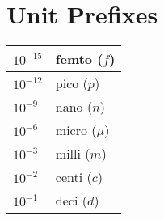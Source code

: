 \documentclass[12pt]{article}
\begin{document}
\section{Unit Prefixes}
\begin{center}
    \begin{tabular}{|l|l|}
        \hline
        $10^{-15}$ & femto	($f$)    \\ \hline
        $10^{-12}$ & pico	($p$)    \\ \hline
        $10^{-9}$  & nano	($n$)    \\ \hline
        $10^{-6}$  & micro	($\mu$)  \\ \hline
        $10^{-3}$  & milli	($m$)    \\ \hline
        $10^{-2}$  & centi	($c$)    \\ \hline
        $10^{-1}$  & deci	($d$)    \\ \hline
    \end{tabular}
\end{center}
\end{document}
